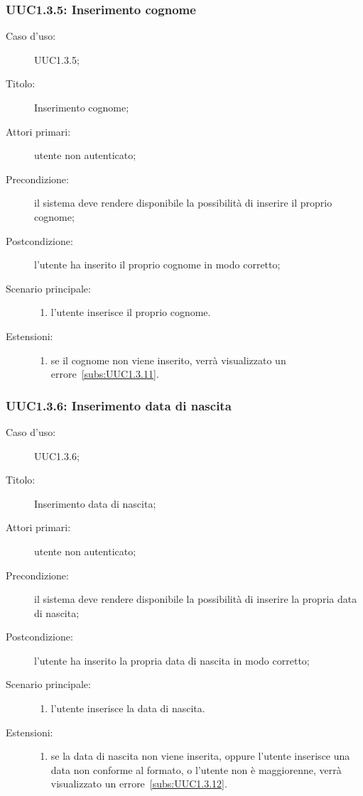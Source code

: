 \documentclass[../../../analisi-dei-requisiti.tex]{subfiles}
\begin{document}
\subsubsection{UUC1.3.5: Inserimento cognome}%
\label{subs:UUC1.3.5}
\begin{description}
  \item[Caso d'uso:] UUC1.3.5;
  \item[Titolo:] Inserimento cognome;
  \item[Attori primari:] utente non autenticato;
  \item[Precondizione:] il sistema deve rendere disponibile la possibilità di inserire il proprio cognome;
  \item[Postcondizione:] l'utente ha inserito il proprio cognome in modo corretto;
  \item[Scenario principale:]
        \begin{enumerate}
          \item l'utente inserisce il proprio cognome.
        \end{enumerate}
  \item[Estensioni:]
        \begin{enumerate}
          \item se il cognome non viene inserito, verrà visualizzato un errore~\ref{subs:UUC1.3.11}.
        \end{enumerate}
\end{description}

\subsubsection{UUC1.3.6: Inserimento data di nascita}%
\label{subs:UUC1.3.6}
\begin{description}
  \item[Caso d'uso:] UUC1.3.6;
  \item[Titolo:] Inserimento data di nascita;
  \item[Attori primari:] utente non autenticato;
  \item[Precondizione:] il sistema deve rendere disponibile la possibilità di inserire la propria data di nascita;
  \item[Postcondizione:] l'utente ha inserito la propria data di nascita in modo corretto;
  \item[Scenario principale:]
        \begin{enumerate}
          \item l'utente inserisce la data di nascita.
        \end{enumerate}
  \item[Estensioni:]
        \begin{enumerate}
          \item se la data di nascita non viene inserita, oppure l'utente inserisce una data non conforme al formato, o l'utente non è maggiorenne, verrà visualizzato un errore~\ref{subs:UUC1.3.12}.
        \end{enumerate}
\end{description}
\end{document}
